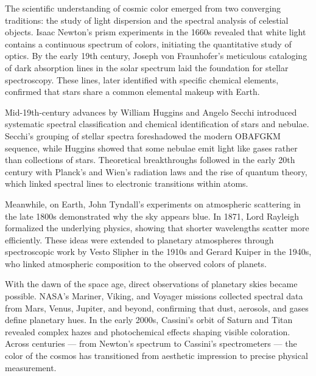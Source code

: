 \begin{historical}
The scientific understanding of cosmic color emerged from two converging traditions: the study of light dispersion and the spectral analysis of celestial objects. Isaac Newton’s prism experiments in the 1660s revealed that white light contains a continuous spectrum of colors, initiating the quantitative study of optics. By the early 19th century, Joseph von Fraunhofer’s meticulous cataloging of dark absorption lines in the solar spectrum laid the foundation for stellar spectroscopy. These lines, later identified with specific chemical elements, confirmed that stars share a common elemental makeup with Earth.

Mid-19th-century advances by William Huggins and Angelo Secchi introduced systematic spectral classification and chemical identification of stars and nebulae. Secchi’s grouping of stellar spectra foreshadowed the modern OBAFGKM sequence, while Huggins showed that some nebulae emit light like gases rather than collections of stars. Theoretical breakthroughs followed in the early 20th century with Planck’s and Wien’s radiation laws and the rise of quantum theory, which linked spectral lines to electronic transitions within atoms.

Meanwhile, on Earth, John Tyndall’s experiments on atmospheric scattering in the late 1800s demonstrated why the sky appears blue. In 1871, Lord Rayleigh formalized the underlying physics, showing that shorter wavelengths scatter more efficiently. These ideas were extended to planetary atmospheres through spectroscopic work by Vesto Slipher in the 1910s and Gerard Kuiper in the 1940s, who linked atmospheric composition to the observed colors of planets.

With the dawn of the space age, direct observations of planetary skies became possible. NASA’s Mariner, Viking, and Voyager missions collected spectral data from Mars, Venus, Jupiter, and beyond, confirming that dust, aerosols, and gases define planetary hues. In the early 2000s, Cassini’s orbit of Saturn and Titan revealed complex hazes and photochemical effects shaping visible coloration. Across centuries — from Newton’s spectrum to Cassini’s spectrometers — the color of the cosmos has transitioned from aesthetic impression to precise physical measurement.
\end{historical}
